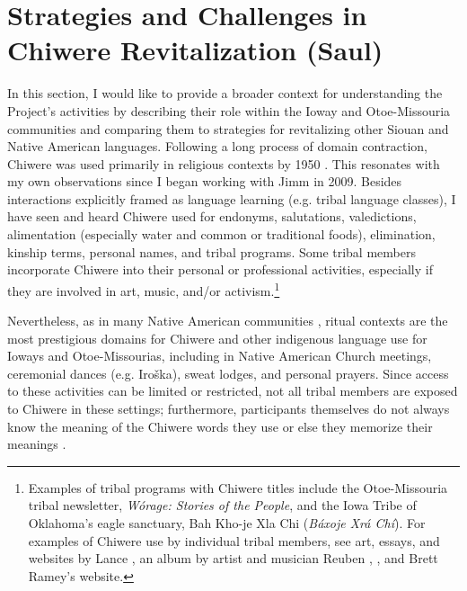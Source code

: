 \documentclass[output=paper]{LSP/langsci}
\begin{document}
\section{Strategies and Challenges in Chiwere Revitalization (Saul)}\label{saul}
In this section, I would like to provide a broader context for understanding the Project's activities by describing their role within the Ioway and Otoe-Missouria communities and comparing them to strategies for revitalizing other Siouan and Native American languages. Following a long process of domain contraction, Chiwere was used primarily in religious contexts by 1950 \citep{Davidson1997, FurbeeStanley1996, FurbeeStanley2002}. This resonates with my own observations since I began working with Jimm in 2009. Besides interactions explicitly framed as language learning (e.g. tribal language classes), I have seen and heard Chiwere used for endonyms, salutations, valedictions, alimentation (especially water and common or traditional foods), elimination, kinship terms, personal names, and tribal programs. Some tribal members incorporate Chiwere into their personal or professional activities, especially if they are involved in art, music, and/or activism.\footnote{Examples of tribal programs with Chiwere titles include the Otoe-Missouria tribal newsletter, \emph{Wórage: Stories of the People}, and the Iowa Tribe of Oklahoma's eagle sanctuary, Bah Kho-je Xla Chi (\emph{Báxoje Xrá Chí}). For examples of Chiwere use by individual tribal members, see art, essays, and websites by Lance \citet{Foster1989, Foster1996, Foster1999, Foster2009, FosterNDa, FosterNDb, FosterNDc}, an album by artist and musician Reuben \citet{Kent2004}, \citet{Jones2004}, and Brett Ramey's \citeyearpar{RameyND} website.} 

Nevertheless, as in many Native American communities \citep[see e.g.][]{Kroskrity1998}, ritual contexts are the most prestigious domains for Chiwere and other indigenous language use for Ioways and Otoe-Missourias, including in Native American Church meetings, ceremonial dances (e.g. Iroška), sweat lodges, and personal prayers. Since access to these activities can be limited or restricted, not all tribal members are exposed to Chiwere in these settings; furthermore, participants themselves do not always know the meaning of the Chiwere words they use or else they memorize their meanings \citep[see e.g.][520--521]{Davidson1997}.
\end{document}
